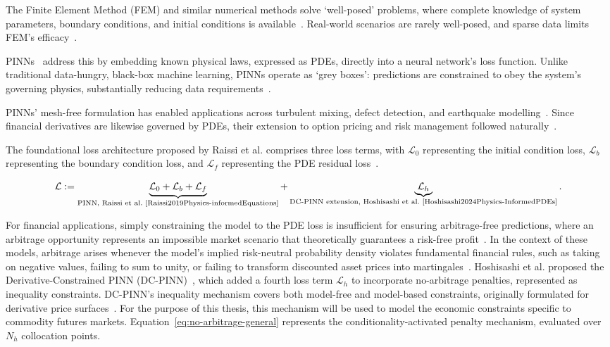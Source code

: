 \documentclass[11pt, a4paper]{article}
\begin{document}
The Finite Element Method (FEM) and similar numerical methods solve `well-posed' problems, where complete knowledge of system parameters, boundary conditions, and initial conditions is available~\cite{Toscano2024FromLearning}. Real-world scenarios are rarely well-posed, and sparse data limits FEM's efficacy~\cite{Toscano2024FromLearning}.

PINNs~\cite{Raissi2019Physics-informedEquations} address this by embedding known physical laws, expressed as PDEs, directly into a neural network's loss function. Unlike traditional data-hungry, black-box machine learning, PINNs operate as `grey boxes': predictions are constrained to obey the system's governing physics, substantially reducing data requirements~\cite{Raissi2019Physics-informedEquations, Toscano2024FromLearning}.

PINNs' mesh-free formulation has enabled applications across turbulent mixing, defect detection, and earthquake modelling~\cite{Toscano2024FromLearning}. Since financial derivatives are likewise governed by PDEs, their extension to option pricing and risk management followed naturally~\cite{Dhiman2023PhysicsPricing, Hainaut2024OptionNetworks}.

The foundational loss architecture proposed by Raissi et al. comprises three loss terms, with $\mathcal{L}_0$ representing the initial condition loss, $\mathcal{L}_b$ representing the boundary condition loss, and $\mathcal{L}_f$ representing the PDE residual loss~\cite{Raissi2019Physics-informedEquations, Hoshisashi2024Whack-a-moleSurface}.

\begin{equation}
    \mathcal{L} := \underbrace{\mathcal{L}_0 + \mathcal{L}_b + \mathcal{L}_f}_{\text{PINN, Raissi et al.~\cite{Raissi2019Physics-informedEquations}}} + \underbrace{\mathcal{L}_h}_{\text{DC-PINN extension, Hoshisashi et al.~\cite{Hoshisashi2024Physics-InformedPDEs}}}.
\end{equation}

For financial applications, simply constraining the model to the PDE loss is insufficient for ensuring arbitrage-free predictions, where an arbitrage opportunity represents an impossible market scenario that theoretically guarantees a risk-free profit~\cite{Hoshisashi2024Whack-a-moleSurface}. In the context of these models, arbitrage arises whenever the model's implied risk-neutral probability density violates fundamental financial rules, such as taking on negative values, failing to sum to unity, or failing to transform discounted asset prices into martingales~\cite{Hoshisashi2025ProbabilitCalibration}. Hoshisashi et al. proposed the Derivative-Constrained PINN (DC-PINN)~\cite{Hoshisashi2024Physics-InformedPDEs}, which added a fourth loss term $\mathcal{L}_h$ to incorporate no-arbitrage penalties, represented as inequality constraints. DC-PINN's inequality mechanism covers both model-free and model-based constraints, originally formulated for derivative price surfaces~\cite{Hoshisashi2024Physics-InformedPDEs}. For the purpose of this thesis, this mechanism will be used to model the economic constraints specific to commodity futures markets. Equation~\ref{eq:no-arbitrage-general} represents the conditionality-activated penalty mechanism, evaluated over $N_h$ collocation points.
\end{document}
